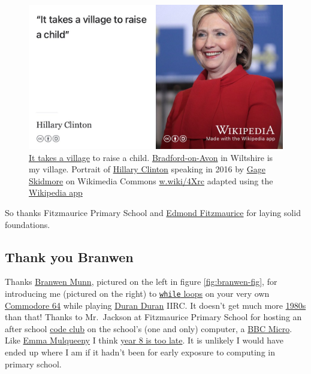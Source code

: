 \documentclass[
]{book}
\begin{document}
\begin{figure}

{\centering \includegraphics[width=1\linewidth]{images/hillary-clinton} 

}

\caption{\href{https://en.wikipedia.org/wiki/It_takes_a_village}{It takes a village} to raise a child. \citep{clinton} \href{https://en.wikipedia.org/wiki/Bradford-on-Avon}{Bradford-on-Avon} in Wiltshire is my village. Portrait of \href{https://en.wikipedia.org/wiki/Hillary_Clinton}{Hillary Clinton} speaking in 2016 by \href{https://en.wikipedia.org/wiki/Gage_Skidmore}{Gage Skidmore} on Wikimedia Commons \href{https://w.wiki/4Xrc}{w.wiki/4Xrc} adapted using the \href{https://apps.apple.com/us/app/wikipedia/id324715238}{Wikipedia app}}\label{fig:clinton-fig}
\end{figure}



So thanks Fitzmaurice Primary School and \href{https://en.wikipedia.org/wiki/Edmond_Fitzmaurice,_1st_Baron_Fitzmaurice}{Edmond Fitzmaurice} for laying solid foundations. 🙏

\hypertarget{branwen}{%
\subsection{Thank you Branwen}\label{branwen}}

Thanks \href{https://www.branwen.online/}{Branwen Munn}, pictured on the left in figure \ref{fig:branwen-fig}, for introducing me (pictured on the right) to \href{https://en.wikipedia.org/wiki/While_loop}{\texttt{while} loops} on your very own \href{https://en.wikipedia.org/wiki/Commodore_64}{Commodore 64} while playing \href{https://en.wikipedia.org/wiki/Duran_Duran}{Duran Duran} IIRC. It doesn't get much more \href{https://en.wikipedia.org/wiki/1980s}{1980s} than that! Thanks to Mr.~Jackson at Fitzmaurice Primary School for hosting an after school \href{https://codeclub.org/}{code club} on the school's (one and only) computer, a \href{https://en.wikipedia.org/wiki/BBC_Micro}{BBC Micro}. Like \href{https://en.wikipedia.org/wiki/Emma_Mulqueeny}{Emma Mulqueeny} I think \href{https://mulqueeny.wordpress.com/2011/08/10/year-8-is-too-late/}{year 8 is too late}. \citep{year8toolate} It is unlikely I would have ended up where I am if it hadn't been for early exposure to computing in primary school. \citep{computersgb}
\end{document}
